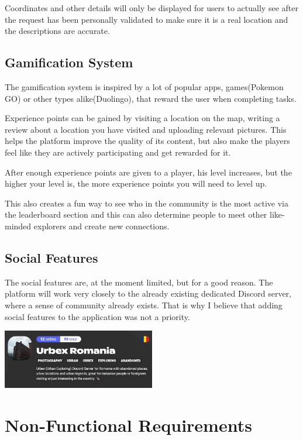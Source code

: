 \documentclass[12pt,a4paper]{report}
\begin{document}
Coordinates and other details will only be displayed for users to actually see after the request has been personally validated to make sure it is a real location and the descriptions are accurate. 

\subsection{Gamification System}
The gamification system is inspired by a lot of popular apps, games(Pokemon GO) or other types alike(Duolingo), that reward the user when completing tasks.

Experience points can be gained by visiting a location on the map, writing a review about a location you have visited and uploading relevant pictures. This helps the platform improve the quality of its content, but also make the players feel like they are actively participating and get rewarded for it.

After enough experience points are given to a player, his level increases, but the higher your level is, the more experience points you will need to level up.

This also creates a fun way to see who in the community is the most active via the leaderboard section and this can also determine people to meet other like-minded explorers and create new connections.

\subsection{Social Features}
The social features are, at the moment limited, but for a good reason. The platform will work very closely to the already existing dedicated Discord server, where a sense of community already exists. That is why I believe that adding social features to the application was not a priority.

\begin{center}
\includegraphics[width=0.5\textwidth]{images/discord.png}
\end{center}

\section{Non-Functional Requirements}
\end{document}
